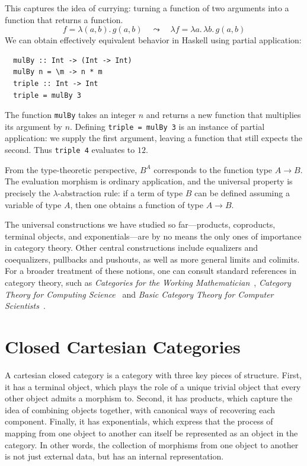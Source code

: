 \begin{remark}
This captures the idea of currying: turning a function of two arguments
into a function that returns a function.
\[
  f = \lambda (a,b).\, g(a,b)
  \quad\leadsto\quad
  \lambda f = \lambda a.\,\lambda b.\, g(a,b)
\]
We can obtain effectively equivalent behavior in Haskell using partial application:
\begin{verbatim}
  mulBy :: Int -> (Int -> Int)
  mulBy n = \m -> n * m
  triple :: Int -> Int
  triple = mulBy 3
\end{verbatim}
\begin{remark}
The function \texttt{mulBy} takes an integer $n$ and returns a new function that
multiplies its argument by $n$. Defining \texttt{triple = mulBy 3} is an instance
of partial application: we supply the first argument, leaving a function
that still expects the second. Thus \texttt{triple 4} evaluates to $12$.
\end{remark}

\end{remark}
\begin{remark}
From the type-theoretic perspective, $B^{A}$ corresponds to the function type
$A \to B$. The evaluation morphism is ordinary application, and the universal
property is precisely the $\lambda$-abstraction rule: if a term of type $B$ can
be defined assuming a variable of type $A$, then one obtains a function of type
$A \to B$.
\end{remark}

The universal constructions we have studied so far---products, coproducts, terminal objects, and exponentials---are by no means the only ones of importance in category theory. Other central constructions include equalizers and coequalizers, pullbacks and pushouts, as well as more general limits and colimits. For a broader treatment of these notions, one can consult standard references in category theory, such as \emph{Categories for the Working Mathematician}~\cite{maclane1971categories}, \emph{Category Theory for Computing Science}~\cite{barr1998category} and \emph{Basic Category Theory for Computer Scientists}~\cite{pierce1991basic}.

\section{\centering Closed Cartesian Categories}

A cartesian closed category is a category with three key pieces of structure. First, it has a terminal object, which plays the role of a unique trivial object that every other object admits a morphism to. Second, it has products, which capture the idea of combining objects together, with canonical ways of recovering each component. Finally, it has exponentials, which express that the process of mapping from one object to another can itself be represented as an object in the category. In other words, the collection of morphisms from one object to another is not just external data, but has an internal representation.  

